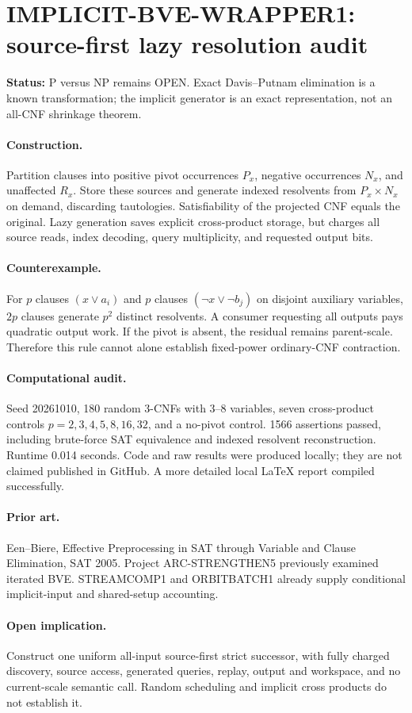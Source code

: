 \documentclass{article}
\begin{document}
\section*{IMPLICIT-BVE-WRAPPER1: source-first lazy resolution audit}
\textbf{Status:} P versus NP remains OPEN. Exact Davis--Putnam elimination is a known transformation; the implicit generator is an exact representation, not an all-CNF shrinkage theorem.
\paragraph{Construction.} Partition clauses into positive pivot occurrences $P_x$, negative occurrences $N_x$, and unaffected $R_x$. Store these sources and generate indexed resolvents from $P_x\times N_x$ on demand, discarding tautologies. Satisfiability of the projected CNF equals the original. Lazy generation saves explicit cross-product storage, but charges all source reads, index decoding, query multiplicity, and requested output bits.
\paragraph{Counterexample.} For $p$ clauses $(x\vee a_i)$ and $p$ clauses $(\neg x\vee\neg b_j)$ on disjoint auxiliary variables, $2p$ clauses generate $p^2$ distinct resolvents. A consumer requesting all outputs pays quadratic output work. If the pivot is absent, the residual remains parent-scale. Therefore this rule cannot alone establish fixed-power ordinary-CNF contraction.
\paragraph{Computational audit.} Seed 20261010, 180 random 3-CNFs with 3--8 variables, seven cross-product controls $p=2,3,4,5,8,16,32$, and a no-pivot control. 1566 assertions passed, including brute-force SAT equivalence and indexed resolvent reconstruction. Runtime 0.014 seconds. Code and raw results were produced locally; they are not claimed published in GitHub. A more detailed local LaTeX report compiled successfully.
\paragraph{Prior art.} Een--Biere, Effective Preprocessing in SAT through Variable and Clause Elimination, SAT 2005. Project ARC-STRENGTHEN5 previously examined iterated BVE. STREAMCOMP1 and ORBITBATCH1 already supply conditional implicit-input and shared-setup accounting.
\paragraph{Open implication.} Construct one uniform all-input source-first strict successor, with fully charged discovery, source access, generated queries, replay, output and workspace, and no current-scale semantic call. Random scheduling and implicit cross products do not establish it.
\end{document}
